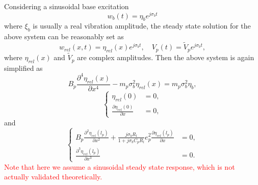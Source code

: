 \documentclass{article}
\begin{document}
Considering a sinusoidal base excitation
\begin{equation}
    w_b(t) = \eta_b e^{j \sigma_b t}
\end{equation}
where $\xi_b$ is usually a real vibration amplitude, the steady state solution for the above system can be reasonably set as
\begin{equation}
    w_{rel}(x,t) = \eta_{rel}(x) e^{j \sigma_b t},\quad V_p(t) = \tilde{V}_p e^{j \sigma_b t},
\end{equation}
where $\eta_{rel}(x)$ and $\tilde{V}_p$ are complex amplitudes. Then the above system is again simplified as 
\begin{equation}
    B_p \frac{\partial^4 \eta_{rel}(x)}{\partial x^4} - m_p \sigma_b^2 \eta_{rel}(x) = m_p \sigma_b^2 \eta_{b},
\end{equation}
\begin{equation}
    \left\{\begin{aligned}
        \eta_{rel}(0) &= 0, \\
        \frac{\partial \eta_{rel}(0)}{\partial x} &= 0,
    \end{aligned}\right.
\end{equation}
and
\begin{equation}
    \left\{\begin{aligned}
        B_p \frac{\partial^2 \eta_{rel}(l_p)}{\partial x^2} + \frac{j \sigma_b R_l }{1 + j \sigma_b C_p R_l } e_p^2 \frac{\partial \eta_{rel}(l_p)}{\partial x} &= 0, \\
        \frac{\partial^3 \eta_{rel}(l_p)}{\partial x^3} &= 0.
    \end{aligned}\right.
\end{equation}
\textcolor{red}{Note that here we assume a sinusoidal steady state response, which is not actually validated theoretically. }
\end{document}
